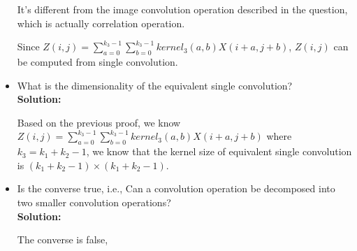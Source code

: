 \documentclass[12pt]{article}%
\begin{document}
\begin{itemize}
        It's different from the image convolution operation described in the question, which is actually correlation operation.
        \par Since $Z(i,j) = \sum_{a=0}^{k_3-1}\sum_{b=0}^{k_3-1}kernel_3(a,b)X(i+a,j+b)$, $Z(i,j)$ can be computed from single convolution.
        \item What is the dimensionality of the equivalent single convolution?\\
        {\bf Solution:}
        \par Based on the previous proof, we know $Z(i,j) = \sum_{a=0}^{k_3-1}\sum_{b=0}^{k_3-1}kernel_3(a,b)X(i+a,j+b)$ where $k_3=k_1+k_2-1$,
        we know that the kernel size of equivalent single convolution is $(k_1+k_2-1)\times (k_1+k_2-1)$.
        \item Is the converse true, i.e.,
        Can a convolution operation be decomposed into two smaller convolution operations?\\
        {\bf Solution:}
        \par The converse is false,
    \end{itemize}

    
    
    
    
    
\end{document}
